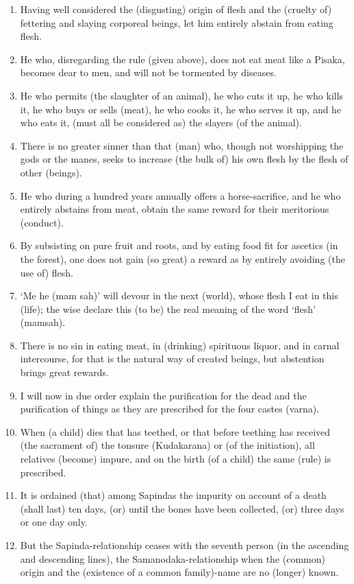 \begin{enumerate}
\item Having well considered the (disgusting) origin of flesh and the (cruelty of) fettering and slaying corporeal beings, let him entirely abstain from eating flesh.
\item He who, disregarding the rule (given above), does not eat meat like a Pisaka, becomes dear to men, and will not be tormented by diseases.
\item He who permits (the slaughter of an animal), he who cuts it up, he who kills it, he who buys or sells (meat), he who cooks it, he who serves it up, and he who eats it, (must all be considered as) the slayers (of the animal).
\item There is no greater sinner than that (man) who, though not worshipping the gods or the manes, seeks to increase (the bulk of) his own flesh by the flesh of other (beings).
\item He who during a hundred years annually offers a horse-sacrifice, and he who entirely abstains from meat, obtain the same reward for their meritorious (conduct).
\item By subsisting on pure fruit and roots, and by eating food fit for ascetics (in the forest), one does not gain (so great) a reward as by entirely avoiding (the use of) flesh.
\item `Me he (mam sah)' will devour in the next (world), whose flesh I eat in this (life); the wise declare this (to be) the real meaning of the word `flesh' (mamsah).
\item There is no sin in eating meat, in (drinking) spirituous liquor, and in carnal intercourse, for that is the natural way of created beings, but abstention brings great rewards.
\item I will now in due order explain the purification for the dead and the purification of things as they are prescribed for the four castes (varna).
\item When (a child) dies that has teethed, or that before teething has received (the sacrament of) the tonsure (Kudakarana) or (of the initiation), all relatives (become) impure, and on the birth (of a child) the same (rule) is prescribed.
\item It is ordained (that) among Sapindas the impurity on account of a death (shall last) ten days, (or) until the bones have been collected, (or) three days or one day only.
\item But the Sapinda-relationship ceases with the seventh person (in the ascending and descending lines), the Samanodaka-relationship when the (common) origin and the (existence of a common family)-name are no (longer) known.

\end{enumerate}
